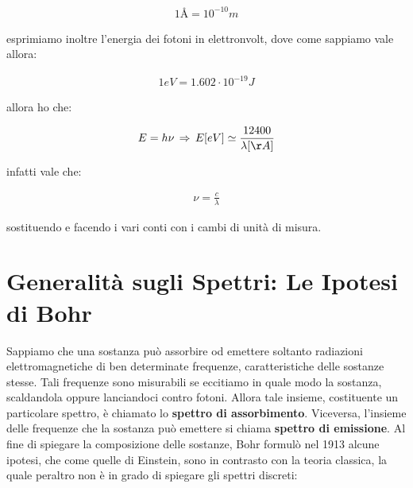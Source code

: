 \begin{align*}
	1Å = 10^{-10} m
\end{align*}  

	esprimiamo inoltre l'energia dei fotoni in elettronvolt, dove come sappiamo vale allora:

\begin{align*}
	1eV = 1.602 \cdot 10^{-19} J
\end{align*}

	allora ho che:

\begin{nb}
\begin{align*}
	E = h\nu \, \Rightarrow \, E\qty[eV] \simeq \frac{12400}{\lambda\qty[Å]}
\end{align*}
\end{nb}

	infatti vale che:
	
\begin{align*}
	\nu = \frac{c}{\lambda}
\end{align*}

	sostituendo e facendo i vari conti  con i cambi di unità di misura.
	
\section{Generalità sugli Spettri: Le Ipotesi di Bohr}

	Sappiamo che una sostanza può assorbire od emettere soltanto radiazioni elettromagnetiche di ben determinate frequenze, caratteristiche delle sostanze stesse. Tali frequenze sono misurabili se eccitiamo in quale modo la sostanza, scaldandola oppure lanciandoci contro fotoni. Allora tale insieme, costituente un particolare spettro, è chiamato lo \textbf{spettro di assorbimento}. Viceversa, l'insieme delle frequenze che la sostanza può emettere si chiama \textbf{spettro di emissione}. Al fine di spiegare la composizione delle sostanze, Bohr formulò nel 1913 alcune ipotesi, che come quelle di Einstein, sono in contrasto con la teoria classica, la quale peraltro non è in grado di spiegare gli spettri discreti:
	
